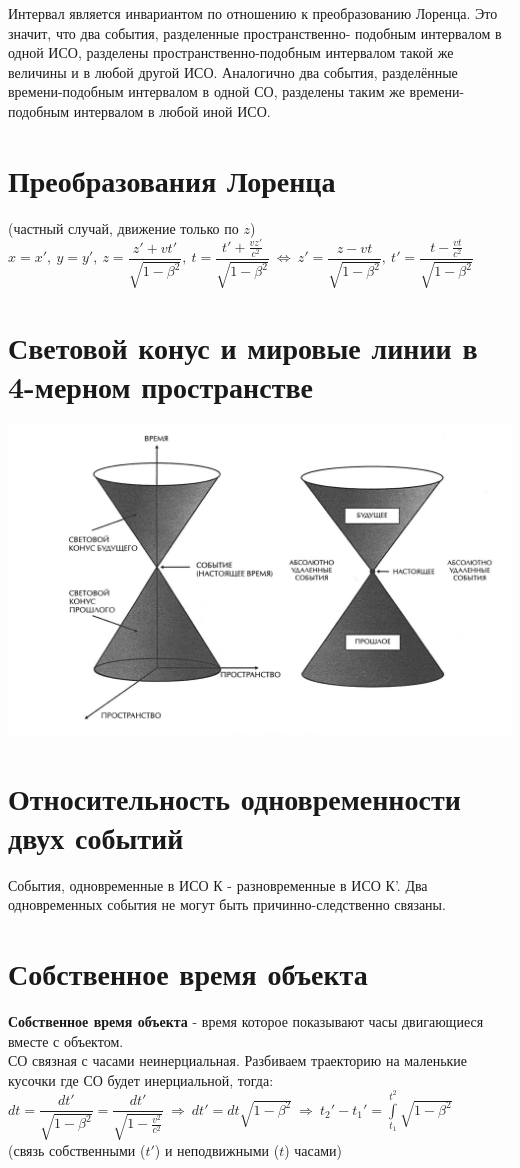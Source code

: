\begin{multicols*}{2}
		Интервал является инвариантом по отношению к преобразованию Лоренца. Это значит, что два события, разделенные пространственно- подобным интервалом в одной ИСО, разделены пространственно-подобным интервалом такой же величины и в любой другой ИСО. Аналогично два события, разделённые времени-подобным интервалом в одной СО, разделены таким же времени-подобным интервалом в любой иной ИСО.
		
		\section{Преобразования Лоренца}
		
		(частный случай, движение только по $ z $) \\ 
		$ x=x',~ y=y',~ z=\dfrac{z'+vt'}{\sqrt{1-\beta^2}},~ t=\dfrac{t'+\frac{vz'}{c^2}}{\sqrt{1-\beta^2}}~\Leftrightarrow~ z'=\dfrac{z-vt}{\sqrt{1-\beta^2}},~ t'=\dfrac{t-\frac{vt}{c^2}}{\sqrt{1-\beta^2}} $
		
		\section{Световой конус и мировые линии в 4-мерном пространстве}
		\includegraphics[width=0.6\linewidth]{sto_img/lihgt_konus}
		
		\section{Относительность одновременности двух событий}
		
		События, одновременные в ИСО К - разновременные в ИСО К'. Два одновременных события не могут быть причинно-следственно связаны.
		
		\section{Собственное время объекта}
		
		\textbf{Собственное время объекта} - время которое показывают часы двигающиеся вместе с объектом. \\
		СО  связная с часами неинерциальная. Разбиваем траекторию на маленькие кусочки где СО будет инерциальной, тогда: \\
		$ dt=\dfrac{dt'}{\sqrt{1-\beta^2}} = \dfrac{dt'}{\sqrt{1-\frac{v^2}{c^2}}} ~\Rightarrow~ dt'=dt\sqrt{1-\beta^2} ~\Rightarrow~ t_2'-t_1' = \int\limits_{t_1}^{t^2}\sqrt{1-\beta^2} $ \\
		(связь собственными ($ t' $) и неподвижными ($ t  $) часами)
		

\end{multicols*}
